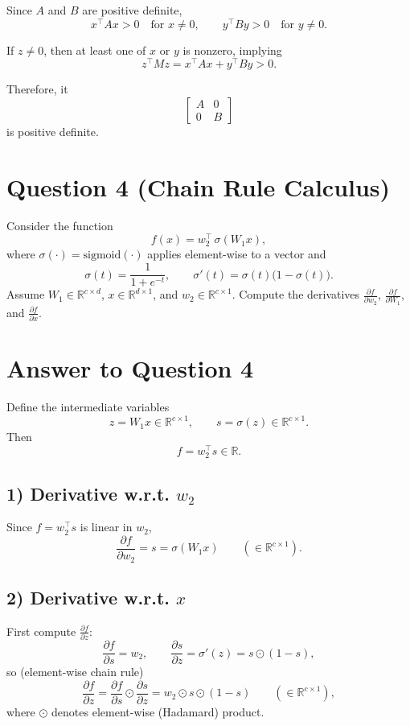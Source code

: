 \documentclass{article}
\begin{document}
Since $A$ and $B$ are positive definite,
\[
x^\top A x > 0 \quad \text{for } x \neq 0,
\qquad
y^\top B y > 0 \quad \text{for } y \neq 0.
\]

If $z \neq 0$, then at least one of $x$ or $y$ is nonzero, implying
\[
z^\top M z = x^\top A x + y^\top B y > 0.
\]

Therefore, it
\[
\begin{bmatrix}
A & 0 \\
0 & B
\end{bmatrix}
\]
is positive definite.
\newpage
\section*{Question 4 (Chain Rule Calculus)}

Consider the function
\[
f(x)=w_2^\top \,\sigma(W_1 x),
\]
where $\sigma(\cdot)=\text{sigmoid}(\cdot)$ applies element-wise to a vector and
\[
\sigma(t)=\frac{1}{1+e^{-t}}, \qquad \sigma'(t)=\sigma(t)\bigl(1-\sigma(t)\bigr).
\]
Assume $W_1\in\mathbb{R}^{c\times d}$, $x\in\mathbb{R}^{d\times 1}$, and $w_2\in\mathbb{R}^{c\times 1}$.
Compute the derivatives $\frac{\partial f}{\partial w_2}$, $\frac{\partial f}{\partial W_1}$, and $\frac{\partial f}{\partial x}$.

\section*{Answer to Question 4}

Define the intermediate variables
\[
z = W_1 x \in \mathbb{R}^{c\times 1}, \qquad s=\sigma(z)\in\mathbb{R}^{c\times 1}.
\]
Then
\[
f = w_2^\top s \in \mathbb{R}.
\]

\subsection*{1) Derivative w.r.t. $w_2$}
Since $f = w_2^\top s$ is linear in $w_2$,
\[
\frac{\partial f}{\partial w_2} = s = \sigma(W_1 x)
\qquad (\in \mathbb{R}^{c\times 1}).
\]

\subsection*{2) Derivative w.r.t. $x$}
First compute $\frac{\partial f}{\partial z}$:
\[
\frac{\partial f}{\partial s} = w_2,
\qquad
\frac{\partial s}{\partial z} = \sigma'(z)= s\odot(1-s),
\]
so (element-wise chain rule)
\[
\frac{\partial f}{\partial z}
=
\frac{\partial f}{\partial s}\odot \frac{\partial s}{\partial z}
=
w_2 \odot s \odot (1-s)
\qquad (\in \mathbb{R}^{c\times 1}),
\]
where $\odot$ denotes element-wise (Hadamard) product.
\end{document}
